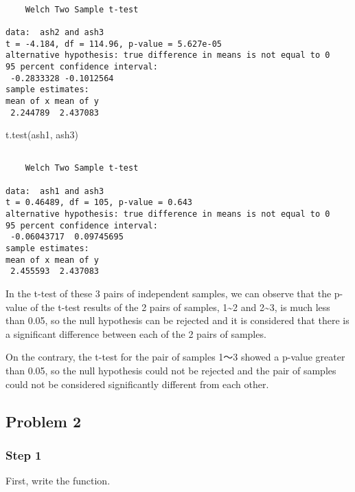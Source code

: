 \documentclass[
  letterpaper,
  DIV=11,
  numbers=noendperiod]{scrartcl}
\newenvironment{Shaded}{\begin{snugshade}}{\end{snugshade}}
\newcommand{\FunctionTok}[1]{\textcolor[rgb]{0.28,0.35,0.67}{#1}}
\newcommand{\NormalTok}[1]{\textcolor[rgb]{0.00,0.23,0.31}{#1}}
\begin{document}
\begin{verbatim}

    Welch Two Sample t-test

data:  ash2 and ash3
t = -4.184, df = 114.96, p-value = 5.627e-05
alternative hypothesis: true difference in means is not equal to 0
95 percent confidence interval:
 -0.2833328 -0.1012564
sample estimates:
mean of x mean of y 
 2.244789  2.437083 
\end{verbatim}

\begin{Shaded}
\begin{Highlighting}[]
\FunctionTok{t.test}\NormalTok{(ash1, ash3)}
\end{Highlighting}
\end{Shaded}

\begin{verbatim}

    Welch Two Sample t-test

data:  ash1 and ash3
t = 0.46489, df = 105, p-value = 0.643
alternative hypothesis: true difference in means is not equal to 0
95 percent confidence interval:
 -0.06043717  0.09745695
sample estimates:
mean of x mean of y 
 2.455593  2.437083 
\end{verbatim}

In the t-test of these 3 pairs of independent samples, we can observe
that the p-value of the t-test results of the 2 pairs of samples,
1\textasciitilde2 and 2\textasciitilde3, is much less than 0.05, so the
null hypothesis can be rejected and it is considered that there is a
significant difference between each of the 2 pairs of samples.

On the contrary, the t-test for the pair of samples 1～3 showed a
p-value greater than 0.05, so the null hypothesis could not be rejected
and the pair of samples could not be considered significantly different
from each other.

\hypertarget{problem-2}{%
\subsection{Problem 2}\label{problem-2}}

\hypertarget{step-1-1}{%
\subsubsection{Step 1}\label{step-1-1}}

First, write the function.
\end{document}
